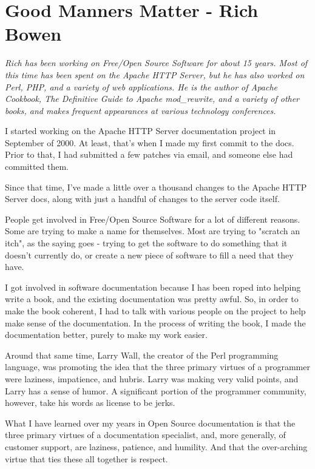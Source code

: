 \chapter{Good Manners Matter - Rich Bowen}

\textit{Rich has been working on Free/Open Source Software for about 15 years. Most of this time has been spent on the Apache HTTP Server, but he has also worked on Perl, PHP, and a variety of web applications. He is the author of Apache Cookbook, The Definitive Guide to Apache mod\_rewrite, and a variety of other books, and makes frequent appearances at various technology conferences.}

I started working on the Apache HTTP Server documentation project in September of 2000. At least, that's when I made my first commit to the docs. Prior to that, I had submitted a few patches via email, and someone else had committed them.

Since that time, I've made a little over a thousand changes to the Apache HTTP Server docs, along with just a handful of changes to the server code itself.

People get involved in Free/Open Source Software for a lot of different reasons. Some are trying to make a name for themselves. Most are trying to "scratch an itch", as the saying goes - trying to get the software to do something that it doesn't currently do, or create a new piece of software to fill a need that they have.

I got involved in software documentation because I has been roped into helping write a book, and the existing documentation was pretty awful. So, in order to make the book coherent, I had to talk with various people on the project to help make sense of the documentation. In the
process of writing the book, I made the documentation better, purely to make my work easier.

Around that same time, Larry Wall, the creator of the Perl programming language, was promoting the idea that the three primary virtues of a programmer were laziness, impatience, and hubris. Larry was making very valid points, and Larry has a sense of humor. A significant portion of the programmer community, however, take his words as license to be jerks.

What I have learned over my years in Open Source documentation is that the three primary virtues of a documentation specialist, and, more generally, of customer support, are laziness, patience, and humility. And that the over-arching virtue that ties these all together is respect.

